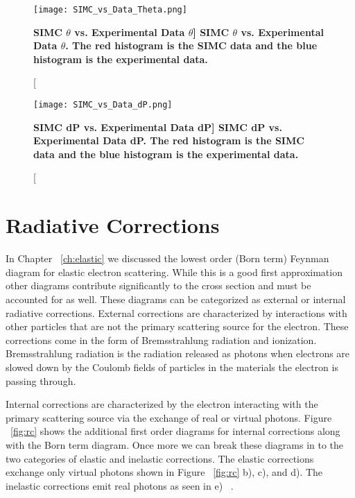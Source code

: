 \begin{figure}[!ht]
\begin{center}
\texttt{[image: SIMC\_vs\_Data\_Theta.png]}
\end{center}
\caption[\bf{SIMC $\theta$ vs. Experimental Data $\theta$}]{
{\bf{SIMC $\theta$ vs. Experimental Data $\theta$.}} The red histogram is the SIMC data and the blue histogram is the experimental data.}
\label{fig:simc_theta}
\end{figure}

\begin{figure}[!ht]
\begin{center}
\texttt{[image: SIMC\_vs\_Data\_dP.png]}
\end{center}
\caption[\bf{SIMC dP vs. Experimental Data dP}]{
{\bf{SIMC dP vs. Experimental Data dP.}} The red histogram is the SIMC data and the blue histogram is the experimental data.}
\label{fig:simc_dp}
\end{figure}

\section{Radiative Corrections}
\label{sec:rc}

In Chapter ~\ref{ch:elastic} we discussed the lowest order (Born term) Feynman diagram for elastic electron scattering. While this is a good first approximation other diagrams contribute significantly to the cross section and must be accounted for as well. These diagrams can be categorized as external or internal radiative corrections. External corrections are characterized by interactions with other particles that are not the primary scattering source for the electron. These corrections come in the form of Bremsstrahlung radiation and ionization. Bremsstrahlung radiation is the radiation released as photons when electrons are slowed down by the Coulomb fields of particles in the materials the electron is passing through. 

Internal corrections are characterized by the electron interacting with the primary scattering source via the exchange of real or virtual photons. Figure ~\ref{fig:rc} shows the additional first order diagrams for internal corrections along with the Born term diagram. Once more we can break these diagrams in to the two categories of elastic and inelastic corrections. The elastic corrections exchange only virtual photons shown in Figure ~\ref{fig:rc} b), c), and d). The inelastic corrections emit real photons as seen in e) ~\cite{Thesis:Wang}.

